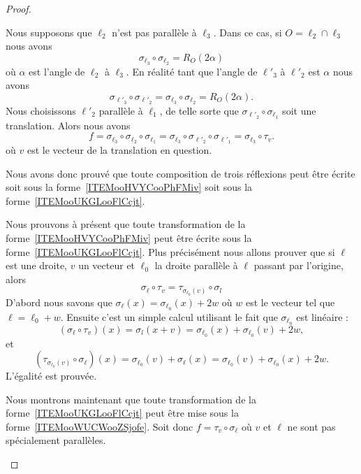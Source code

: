 \begin{proof}
\begin{subproof}
		Nous supposons que \( \ell_2\) n'est pas parallèle à \( \ell_3\). Dans ce cas, si \( O=\ell_2\cap\ell_3\) nous avons
		\begin{equation}
			\sigma_{\ell_3}\circ\sigma_{\ell_2}=R_O(2\alpha)
		\end{equation}
		où \( \alpha\) est l'angle de \( \ell_2\) à \( \ell_3\). En réalité tant que l'angle de \( \ell'_3\) à \( \ell'_2\) est \( \alpha\) nous avons
		\begin{equation}
			\sigma_{\ell'_3}\circ\sigma_{\ell'_2}= \sigma_{\ell_3}\circ\sigma_{\ell_2}=R_O(2\alpha).
		\end{equation}
		Nous choisissons \( \ell'_2\) parallèle à \( \ell_1\), de telle sorte que \( \sigma_{\ell'_2}\circ\sigma_{\ell_1}\) soit une translation. Alors nous avons
		\begin{equation}
			f=\sigma_{\ell_3}\circ\sigma_{\ell_2}\circ\sigma_{\ell_1}=\sigma_{\ell_3}\circ\sigma_{\ell'_2}\circ\sigma_{\ell'_1}=\sigma_{\ell_3}\circ\tau_v.
		\end{equation}
		où \( v\) est le vecteur de la translation en question.

		Nous avons donc prouvé que toute composition de trois réflexions peut être écrite soit sous la forme~\ref{ITEMooHVYCooPhFMiv} soit sous la forme~\ref{ITEMooUKGLooFlCcjt}.

		Nous prouvons à présent que toute transformation de la forme~\ref{ITEMooHVYCooPhFMiv} peut être écrite sous la forme~\ref{ITEMooUKGLooFlCcjt}. Plus précisément nous allons prouver que si \( \ell\) est une droite, \( v\) un vecteur et \( \ell_0\) la droite parallèle à \( \ell\) passant par l'origine, alors
		\begin{equation}
			\sigma_{\ell}\circ\tau_v=\tau_{\sigma_{\ell_0}(v)}\circ\sigma_l
		\end{equation}
		D'abord nous savons que \( \sigma_{\ell}(x)=\sigma_{\ell_0}(x)+2w\) où \( w\) est le vecteur tel que \( \ell=\ell_0+w\). Ensuite c'est un simple calcul utilisant le fait que \( \sigma_{\ell_0}\) est linéaire :
		\begin{equation}
			(\sigma_{\ell}\circ\tau_v)(x)=\sigma_l(x+v)=\sigma_{\ell_0}(x)+\sigma_{\ell_0}(v)+2w,
		\end{equation}
		et
		\begin{equation}
			(\tau_{\sigma_{\ell_0}(v)}\circ\sigma_{\ell})(x)=\sigma_{\ell_0}(v)+\sigma_{\ell}(x)=\sigma_{\ell_0}(v)+\sigma_{\ell_0}(x)+2w.
		\end{equation}
		L'égalité est prouvée.

		Nous montrons maintenant que toute transformation de la forme~\ref{ITEMooUKGLooFlCcjt} peut être mise sous la forme~\ref{ITEMooWUCWooZSjofe}. Soit donc \( f=\tau_v\circ\sigma_{\ell}\) où \( v\) et \( \ell\) ne sont pas spécialement parallèles.


\end{subproof}
\end{proof}
